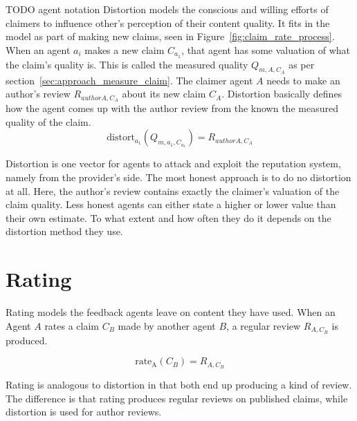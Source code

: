 \documentclass[%
    ]{\PathToTumTemplate/thesis/tum_thesis}
\begin{document}
TODO agent notation
Distortion models the conscious and willing efforts of claimers to influence other's perception of their content quality.
It fits in the model as part of making new claims, seen in Figure~\ref{fig:claim_rate_process}.
When an agent $a_i$ makes a new claim $C_{a_{1}}$, that agent has some valuation of what the claim's quality is.
This is called the measured quality $Q_{m,A,C_{A}}$ as per section~\ref{sec:approach_measure_claim}.
The claimer agent $A$ needs to make an author's review $R_{author A, C_{A}}$ about its new claim $C_A$.
Distortion basically defines how the agent comes up with the author review from the known the measured quality of the claim.
\begin{equation}
\mathrm{distort}_{a_1}(Q_{m,a_{1},C_{a_{1}}}) = R_{author A, C_{A}}
\end{equation}

Distortion is one vector for agents to attack and exploit the reputation system, namely from the provider's side.
The most honest approach is to do no distortion at all.
Here, the author's review contains exactly the claimer's valuation of the claim quality.
Less honest agents can either state a higher or lower value than their own estimate.
To what extent and how often they do it depends on the distortion method they use.




\section{Rating}\label{sec:approach_rating_strategies}

Rating models the feedback agents leave on content they have used.
When an Agent $A$ rates a claim $C_B$ made by another agent $B$, a regular review $R_{A,C_{B}}$ is produced.

\begin{equation}
\mathrm{rate_{A}}(C_B) = R_{A, C_{B}}
\end{equation}

Rating is analogous to distortion in that both end up producing a kind of review.
The difference is that rating produces regular reviews on published claims, while distortion is used for author reviews.
\end{document}

